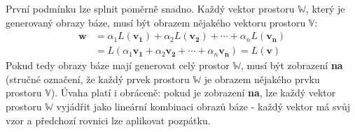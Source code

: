 \documentclass[a5paper,12pt]{amsbook}
\theoremstyle{definition}
\newcommand{\myscalar}[1]{#1}
\newcommand{\myvec}[1]{\bm{#1}}
\newcommand{\myspace}[1]{\mathbb{#1}}
\newcommand{\mymap}[1]{#1}
\begin{document}
První podmínku lze splnit poměrně snadno. Každý vektor prostoru $\myspace{W}$, který je
generovaný obrazy báze, musí být obrazem nějakého vektoru prostoru $\myspace{V}$:
\begin{equation*}
\begin{split}
\myvec{w}
  &= \myscalar{\alpha{}_1}\mymap{L}(\myvec{v_1}) + \myscalar{\alpha{}_2}\mymap{L}(\myvec{v_2})
      + \cdots + \myscalar{\alpha{}_n}\mymap{L}(\myvec{v_n}) \\
  &= \mymap{L}(\myscalar{\alpha{}_1}\myvec{v_1} + \myscalar{\alpha{}_2}\myvec{v_2} + \cdots 
      + \myscalar{\alpha{}_n}\myvec{v_n}) = \mymap{L}(\myvec{v})
\end{split}
\end{equation*}
Pokud tedy obrazy báze mají generovat celý prostor $\myspace{W}$, musí být zobrazení \textbf{na}
(stručné označení, že každý prvek prostoru $\myspace{W}$ je obrazem nějakého prvku prostoru
$\myspace{V}$). Úvaha platí i obráceně: pokud je zobrazení \textbf{na}, lze každý vektor
prostoru $\myspace{W}$ vyjádřit jako lineární kombinaci obrazů báze - každý vektor má
svůj vzor a předchozí rovnici lze aplikovat pozpátku.
\end{document}
